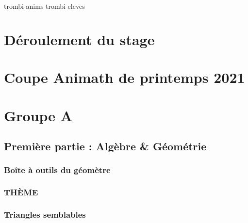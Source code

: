 \documentclass[poly,trombi]{valbonne}
\begin{document}

\pagestyle{plain}

\footnotesize
\pagestyle{trombi}
{trombi-anims}
\newpage
{trombi-eleves}


\normalsize


\pagestyle{empty}

\renewcommand{\headrulewidth}{0.4pt}

\tableofcontents

\chapter{Déroulement du stage}
\pagestyle {plain}



\chapter{Coupe Animath de printemps 2021}







\chapter{Groupe A}

\minitoc \clearpage

\section{Première partie : Algèbre \& Géométrie}

\subsection{Boîte à outils du géomètre}


\subsection{THÈME}


\subsection{Triangles semblables}
\end{document}
